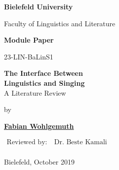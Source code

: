 \begin{center}

\Huge{\textbf{Bielefeld University}}

\LARGE{Faculty of Linguistics and Literature}

\vfill

\LARGE{\textbf{Module Paper}}

\Large

23-LIN-BaLinS1

\vfill


\vspace*{1cm}

\LARGE{\textbf{The Interface Between\\Linguistics and Singing}\\A Literature Review}

\Large

\vfill

by

\vspace*{1cm}

\textbf{\href{https://www.fabianwohlgemuth.de}{Fabian Wohlgemuth}}

\vfill

$\begin{aligned}
\text{Reviewed by:}&\ \text{Dr. Beste Kamali}\\
\end{aligned}$

\vfill

Bielefeld, October 2019

\end{center}
\restoregeometry